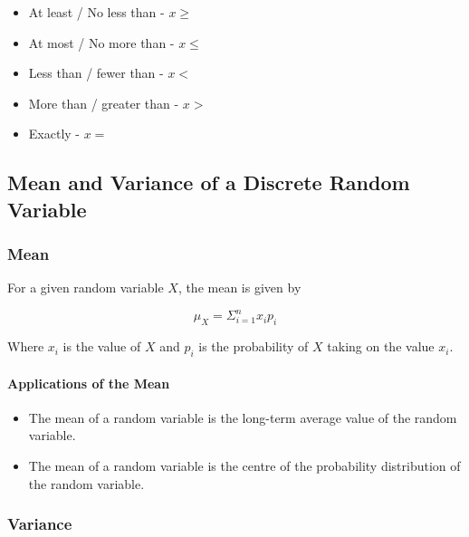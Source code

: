 \documentclass[12pt letter]{report}
\begin{document}
\begin{itemize}
  \item At least / No less than - $ x \geq$
  \item At most / No more than - $x \leq$
  \item Less than / fewer than - $ x <$
  \item  More than / greater than - $ x >$
  \item Exactly - $ x =$
\end{itemize}

\subsection{Mean and Variance of a Discrete Random Variable}

\subsubsection{Mean}


For a given random variable $X$, the mean is given by

\[
  \mu_{X} = \Sigma_{i=1}^{n} x_i p_i
\]

Where $x_i$ is the value of $X$ and $p_i$ is the probability of $X$ taking on the value $x_i$.


\paragraph{Applications of the Mean}

\begin{itemize}
  \item The mean of a random variable is the long-term average value of the random variable.
  \item The mean of a random variable is the centre of the probability distribution of the random variable.
\end{itemize}

\subsubsection{Variance}

\end{document}
